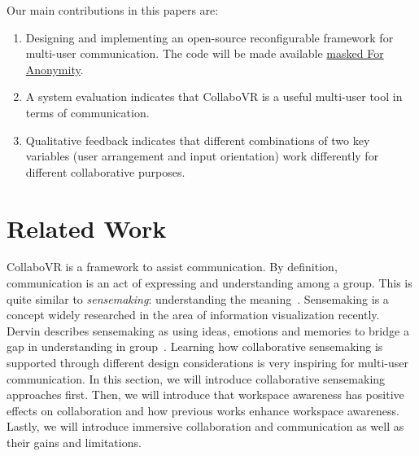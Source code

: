 \documentclass{sigchi}
\begin{document}
Our main contributions in this papers are:
\begin{enumerate}
    \item Designing and implementing an open-source reconfigurable framework for multi-user communication. The code will be made available \url{masked For Anonymity}.
    \item A system evaluation indicates that CollaboVR is a useful multi-user tool in terms of communication.
    \item Qualitative feedback indicates that different combinations of two key variables (user arrangement and input orientation) work differently for different collaborative purposes.
\end{enumerate}


\section{Related Work}
CollaboVR is a framework to assist communication. By definition, communication is an act of expressing and understanding among a group. This is quite similar to \textit{sensemaking}: understanding the meaning~\cite{paul2009understanding}. Sensemaking is a concept widely researched in the area of information visualization recently. Dervin describes sensemaking as using ideas, emotions and memories to bridge a gap in understanding in group~\cite{dervin1992mind}. Learning how collaborative sensemaking is supported through different design considerations is very inspiring for multi-user communication. In this section, we will introduce collaborative sensemaking approaches first. Then, we will introduce that workspace awareness has positive effects on collaboration and how previous works enhance workspace awareness. Lastly, we will introduce immersive collaboration and communication as well as their gains and limitations.
\end{document}
